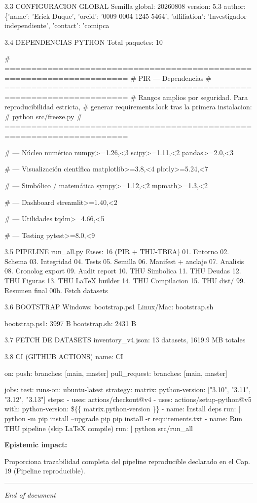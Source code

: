 ﻿\documentclass[11pt,letterpaper]{article}
\begin{document}
3.3 CONFIGURACION GLOBAL
Semilla global: 20260808
version: 5.3
author: \{'name': 'Erick Duque', 'orcid': '0009-0004-1245-5464', 'affiliation': 'Investigador independiente', 'contact': 'comipca

3.4 DEPENDENCIAS PYTHON
Total paquetes: 10

\# =====================================================================
\# PIR — Dependencias
\# =====================================================================
\# Rangos amplios por seguridad. Para reproducibilidad estricta,
\# generar requirements.lock tras la primera instalacion:
\#     python src/freeze.py
\# =====================================================================

\# --- Núcleo numérico
numpy>=1.26,<3
scipy>=1.11,<2
pandas>=2.0,<3

\# --- Visualización científica
matplotlib>=3.8,<4
plotly>=5.24,<7

\# --- Simbólico / matemática
sympy>=1.12,<2
mpmath>=1.3,<2

\# --- Dashboard
streamlit>=1.40,<2

\# --- Utilidades
tqdm>=4.66,<5

\# --- Testing
pytest>=8.0,<9

3.5 PIPELINE run\_all.py
Fases: 16 (PIR + THU-TBEA)
  01. Entorno
  02. Schema
  03. Integridad
  04. Tests
  05. Semilla
  06. Manifest + anclaje
  07. Analisis
  08. Cronolog export
  09. Audit report
  10. THU Simbolica
  11. THU Deudas
  12. THU Figuras
  13. THU LaTeX builder
  14. THU Compilacion
  15. THU dist/
  99. Resumen final
  00b. Fetch datasets

3.6 BOOTSTRAP
Windows: bootstrap.ps1
Linux/Mac: bootstrap.sh

bootstrap.ps1: 3997 B
bootstrap.sh: 2431 B

3.7 FETCH DE DATASETS
inventory\_v4.json: 13 datasets, 1619.9 MB totales

3.8 CI (GITHUB ACTIONS)
name: CI

on:
  push:
    branches: [main, master]
  pull\_request:
    branches: [main, master]

jobs:
  test:
    runs-on: ubuntu-latest
    strategy:
      matrix:
        python-version: ["3.10", "3.11", "3.12", "3.13"]
    steps:
      - uses: actions/checkout@v4
      - uses: actions/setup-python@v5
        with:
          python-version: \$\{\{ matrix.python-version \}\}
      - name: Install deps
        run: |
          python -m pip install --upgrade pip
          pip install -r requirements.txt
      - name: Run THU pipeline (skip LaTeX compile)
        run: |
          python src/run\_all

\textbf{Epistemic impact:}

Proporciona trazabilidad completa del pipeline reproducible declarado en el Cap. 19 (Pipeline reproducible).

\vspace{1em}\hrule\vspace{1em}
\newpage
\vspace{2em}
\begin{center}
\small
\textit{End of document}
\end{center}
\newpage
\nocite{*}


\end{document}
